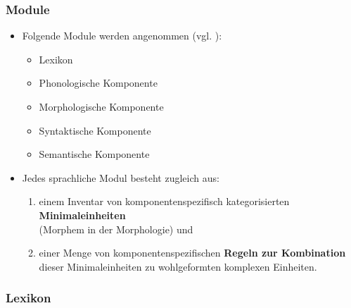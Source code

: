 \begin{frame}
\frametitle{Module}
\begin{itemize}
	\item Folgende Module werden angenommen (vgl. \citealp{Abramowski2016}):
		
	\begin{itemize}
		\item Lexikon
		\item Phonologische Komponente
		\item Morphologische Komponente
		\item Syntaktische Komponente
		\item Semantische Komponente
	\end{itemize}
		
	\item<2-> Jedes sprachliche Modul besteht zugleich aus:
	
	\begin{enumerate}
		\item<2-> einem Inventar von komponentenspezifisch kategorisierten \textbf{Minimaleinheiten}\\
                         (\zB Morphem in der Morphologie) und
		\item<2-> einer Menge von komponentenspezifischen \textbf{Regeln zur Kombination} dieser Minimaleinheiten zu wohlgeformten komplexen Einheiten. 
	\end{enumerate}		  
		
\end{itemize}

\end{frame}


\subsubsection{Lexikon}


